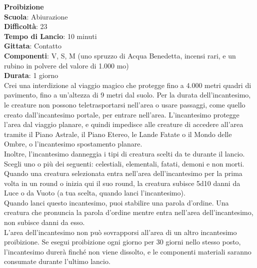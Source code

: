 \begin{multicols}{2}
\medskip\textbf{Proibizione}\\
\textbf{Scuola}: Abiurazione\\
\textbf{Difficoltà}: 23\\
\textbf{Tempo di Lancio}: 10 minuti\\
\textbf{Gittata}: Contatto\\
\textbf{Componenti}: V, S, M (uno spruzzo di Acqua Benedetta, incensi rari, e un rubino in polvere del valore di 1.000 mo)\\
\textbf{Durata}: 1 giorno\\
Crei una interdizione al viaggio magico che protegge fino a 4.000 metri quadri di pavimento, fino a un'altezza di 9 metri dal suolo. Per la durata dell'incantesimo, le creature non possono teletrasportarsi nell'area o usare passaggi, come quello creato dall'incantesimo portale, per entrare nell'area. L'incantesimo protegge l'area dal viaggio planare, e quindi impedisce alle creature di accedere all'area tramite il Piano Astrale, il Piano Etereo, le Lande Fatate o il Mondo delle Ombre, o l'incantesimo spostamento planare.\\
Inoltre, l'incantesimo danneggia i tipi di creatura scelti da te durante il lancio. Scegli uno o più dei seguenti: celestiali, elementali, fatati, demoni e non morti. Quando una creatura selezionata entra nell'area dell'incantesimo per la prima volta in un round o inizia qui il suo round, la creatura subisce 5d10 danni da Luce o da Vuoto (a tua scelta, quando lanci l'incantesimo). \\
Quando lanci questo incantesimo, puoi stabilire una parola d'ordine. Una creatura che pronuncia la parola d'ordine mentre entra nell'area dell'incantesimo, non subisce danni da esso.\\
L'area dell'incantesimo non può sovrapporsi all'area di un altro incantesimo proibizione. Se esegui proibizione ogni giorno per 30 giorni nello stesso posto, l'incantesimo durerà finché non viene dissolto, e le componenti materiali saranno consumate durante l'ultimo lancio.


\end{multicols}
